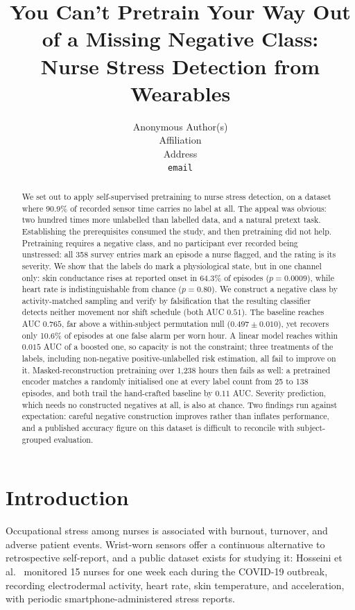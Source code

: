 \documentclass{article}
\title{You Can't Pretrain Your Way Out of a Missing Negative Class:\\
Nurse Stress Detection from Wearables}
\author{%
  Anonymous Author(s) \\
  Affiliation \\
  Address \\
  \texttt{email} \\
}
\begin{document}
\maketitle

\begin{abstract}
We set out to apply self-supervised pretraining to nurse stress detection,
on a dataset where 90.9\% of recorded sensor time carries no label
at all. The appeal was obvious: two hundred times more unlabelled than labelled
data, and a natural pretext task. Establishing the prerequisites consumed the
study, and then pretraining did not help. Pretraining requires a negative
class, and no participant ever recorded being unstressed: all 358 survey
entries mark an episode a nurse flagged, and the rating is its severity. We show that the labels do
mark a physiological state, but in one channel only: skin conductance rises at
reported onset in 64.3\% of episodes ($p = 0.0009$), while heart
rate is indistinguishable from chance ($p = 0.80$). We construct a negative
class by activity-matched sampling and verify by falsification that the
resulting classifier detects neither movement nor shift schedule (both
AUC $0.51$). The baseline reaches AUC $0.765$, far above a within-subject
permutation null ($0.497 \pm 0.010$), yet recovers only 10.6\% of
episodes at one false alarm per worn hour. A linear model reaches within
$0.015$ AUC of a boosted one, so capacity is not the constraint; three
treatments of the labels, including non-negative positive-unlabelled risk
estimation, all fail to improve on it. Masked-reconstruction pretraining over
1,238 hours then fails as well: a pretrained encoder matches a randomly
initialised one at every label count from 25 to 138 episodes, and both trail
the hand-crafted baseline by $0.11$ AUC. Severity prediction, which needs no
constructed negatives at all, is also at chance. Two findings run against
expectation: careful negative construction improves rather than inflates
performance, and a published accuracy figure on this dataset is difficult to
reconcile with subject-grouped evaluation.
\end{abstract}

\section{Introduction}

Occupational stress among nurses is associated with burnout, turnover, and
adverse patient events. Wrist-worn sensors offer a continuous alternative to
retrospective self-report, and a public dataset exists for studying it:
Hosseini et al.\ \cite{hosseini2022} monitored 15 nurses for one week each
during the COVID-19 outbreak, recording electrodermal activity, heart rate,
skin temperature, and acceleration, with periodic smartphone-administered
stress reports.
\end{document}
